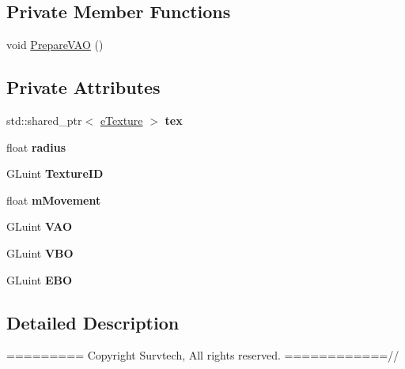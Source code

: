\subsection*{Private Member Functions}
\begin{DoxyCompactItemize}
\item 
void \hyperlink{class_sun_a14d4e698e1d477d14b5ac84dc311446f}{Prepare\+V\+AO} ()
\end{DoxyCompactItemize}
\subsection*{Private Attributes}
\begin{DoxyCompactItemize}
\item 
std\+::shared\+\_\+ptr$<$ \hyperlink{classe_texture}{e\+Texture} $>$ {\bfseries tex}\hypertarget{class_sun_a8ae090bb2912e50ac55ec4e9f7f4e4e8}{}\label{class_sun_a8ae090bb2912e50ac55ec4e9f7f4e4e8}

\item 
float {\bfseries radius}\hypertarget{class_sun_a3bc12a74bbbb49f0f77dcf32de332d7e}{}\label{class_sun_a3bc12a74bbbb49f0f77dcf32de332d7e}

\item 
G\+Luint {\bfseries Texture\+ID}\hypertarget{class_sun_a8eab40b64942412ea07c443f4398d5b8}{}\label{class_sun_a8eab40b64942412ea07c443f4398d5b8}

\item 
float {\bfseries m\+Movement}\hypertarget{class_sun_a486ac23281a66c90ba24e181903a527e}{}\label{class_sun_a486ac23281a66c90ba24e181903a527e}

\item 
G\+Luint {\bfseries V\+AO}\hypertarget{class_sun_a82ec072ad094119b8efff93954106a21}{}\label{class_sun_a82ec072ad094119b8efff93954106a21}

\item 
G\+Luint {\bfseries V\+BO}\hypertarget{class_sun_a56b11001a0b61e52cb51312907c25a9d}{}\label{class_sun_a56b11001a0b61e52cb51312907c25a9d}

\item 
G\+Luint {\bfseries E\+BO}\hypertarget{class_sun_a42ac7b8f44fdc3c95d96c1a83e5f1bb9}{}\label{class_sun_a42ac7b8f44fdc3c95d96c1a83e5f1bb9}

\end{DoxyCompactItemize}


\subsection{Detailed Description}
========= Copyright Survtech, All rights reserved. ============//


